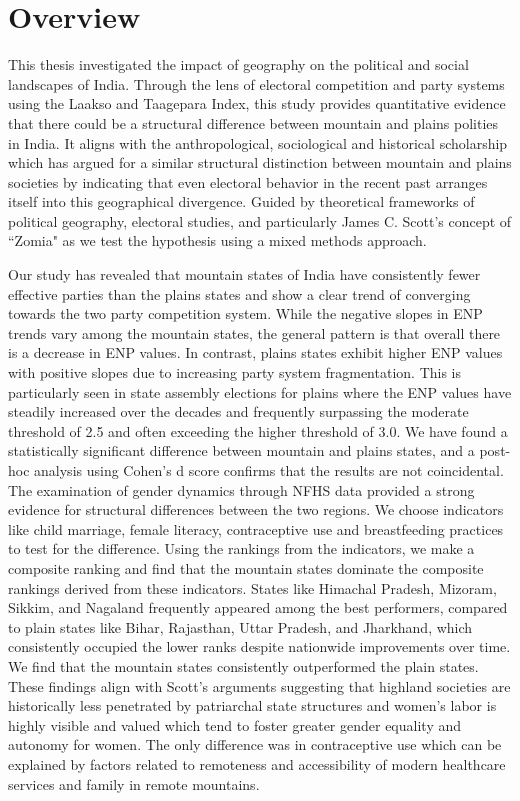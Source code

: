 \begin{sloppypar}

\section{Overview}
This thesis investigated the impact of geography on the political and social landscapes of India. Through the lens of electoral competition and party systems using the Laakso and Taagepara Index, this study provides quantitative evidence that there could be a structural difference between mountain and plains polities in India. It aligns with the anthropological, sociological and historical scholarship which has argued for a similar structural distinction between mountain and plains societies by indicating that even electoral behavior in the recent past arranges itself into this geographical divergence. Guided by  theoretical frameworks of political geography, electoral studies, and particularly James C. Scott's concept of ``Zomia" as we test the hypothesis using a mixed methods approach.


Our study has revealed that mountain states of India have consistently fewer effective parties than the plains states and show a clear trend of converging towards the two party competition system. While the negative slopes in ENP trends vary among the mountain states, the general pattern is that overall there is a decrease in ENP values. In contrast, plains states exhibit higher ENP values with positive slopes due to increasing party system fragmentation. This is particularly seen in state assembly elections for plains where the ENP values have steadily increased over the decades and frequently surpassing the moderate threshold of 2.5 and often exceeding the higher threshold of 3.0. We have found a statistically significant difference between mountain and plains states, and a post-hoc analysis using Cohen’s d score confirms that the results are not coincidental. The examination of gender dynamics through NFHS data provided a strong evidence for structural differences between the two regions. We choose indicators like child marriage, female literacy, contraceptive use and breastfeeding practices to test for the difference.  Using the rankings from the indicators, we make a composite ranking and find that the mountain states dominate the composite rankings derived from these indicators. States like Himachal Pradesh, Mizoram, Sikkim, and Nagaland frequently appeared among the best performers, compared to plain states like Bihar, Rajasthan, Uttar Pradesh, and Jharkhand, which consistently occupied the lower ranks despite nationwide improvements over time. We find that the mountain states consistently outperformed the plain states. These findings align with Scott's arguments suggesting that highland societies are historically less penetrated by patriarchal state structures and women's labor is highly visible and valued which tend to foster greater gender equality and autonomy for women. The only difference was in contraceptive use which can be explained by factors related to remoteness and accessibility of modern healthcare services and family in remote mountains. 



\end{sloppypar}
